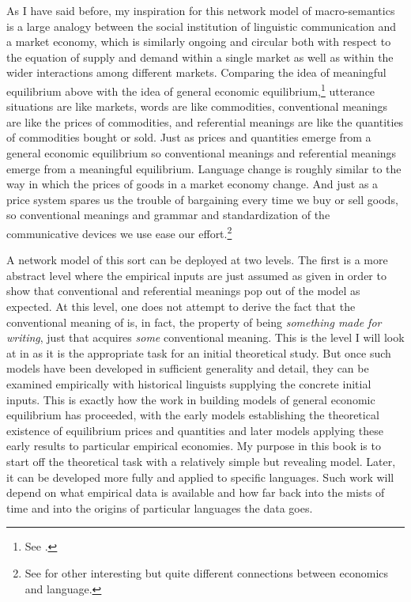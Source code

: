As I have said before, my inspiration for this network model of macro-seman\-tics is a large analogy between the social institution of linguistic communication and a market economy, which is similarly ongoing and circular both with respect to the equation of supply and demand within a single market as well as within the wider interactions among different markets. Comparing the idea of meaningful equilibrium above with the idea of general economic equilibrium,\footnote{See \citet{ad:ecece}.} utterance situations are like markets, words are like commodities, conventional meanings are like the prices of commodities, and referential meanings are like the quantities of commodities bought or sold. Just as prices and quantities emerge from a general economic equilibrium so conventional meanings and referential meanings emerge from a meaningful equilibrium. Language change is roughly similar to the way in which the prices of goods in a market economy change. And just as a price system spares us the trouble of bargaining every time we buy or sell goods, so conventional meanings and grammar and standardization of the communicative devices we use ease our effort.\footnote{See \citet{rubinstein:el} for other interesting but quite different connections between economics and language.} 

A network model of this sort can be deployed at two levels. The first is a more abstract level where the empirical inputs are just assumed as given in order to show that conventional and referential meanings pop out of the model as expected. At this level, one does not attempt to derive the fact that the conventional meaning of  is, in fact, the property of being \emph{something made for writing}, just that  acquires \emph{some} conventional meaning. This is the level I will look at in  as it is the appropriate task for an initial theoretical study. But once such models have been developed in sufficient generality and detail, they can be examined empirically with historical linguists supplying the concrete initial inputs. This is exactly how the work in building models of general economic equilibrium has proceeded, with the early models establishing the theoretical existence of equilibrium prices and quantities and later models applying these early results to particular empirical economies. My purpose in this book is to start off the theoretical task with a relatively simple but revealing model. Later, it can be developed more fully and applied to specific languages. Such work will depend on what empirical data is available and how far back into the mists of time and into the origins of particular languages the data goes.

